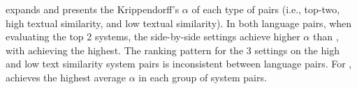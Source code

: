  expands  and presents the Krippendorff's $\alpha$ of each type of pairs (i.e., top-two, high textual similarity, and low textual similarity). In both language pairs, when evaluating the top 2 systems, the side-by-side settings achieve higher $\alpha$ than \psxsmqm, with \sxsmqm achieving the highest. The ranking pattern for the 3 settings on the high and low text similarity system pairs is inconsistent between language pairs. For \EnDe, \sxsmqm achieves the highest average $\alpha$ in each group of system pairs.

\begin{table}[htbp]
    \fontsize{5}{6}\selectfont
    \centering
    \caption{Krippendorff's $\alpha$ of annotators' agreement in three annotation settings based on all system pairs and system pairs of three characteristics.
    }
    \label{tab:inter-AA_expanded}
\end{table}